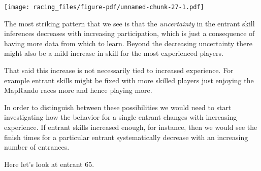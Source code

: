 \documentclass[
  letterpaper,
  DIV=11,
  numbers=noendperiod]{scrartcl}
\begin{document}
\texttt{[image: racing\_files/figure-pdf/unnamed-chunk-27-1.pdf]}

The most striking pattern that we see is that the \emph{uncertainty} in
the entrant skill inferences decreases with increasing participation,
which is just a consequence of having more data from which to learn.
Beyond the decreasing uncertainty there might also be a mild increase in
skill for the most experienced players.

That said this increase is not necessarily tied to increased experience.
For example entrant skills might be fixed with more skilled players just
enjoying the MapRando races more and hence playing more.

In order to distinguish between these possibilities we would need to
start investigating how the behavior for a single entrant changes with
increasing experience. If entrant skills increased enough, for instance,
then we would see the finish times for a particular entrant
systematically decrease with an increasing number of entrances.

Here let's look at entrant 65.
\end{document}
